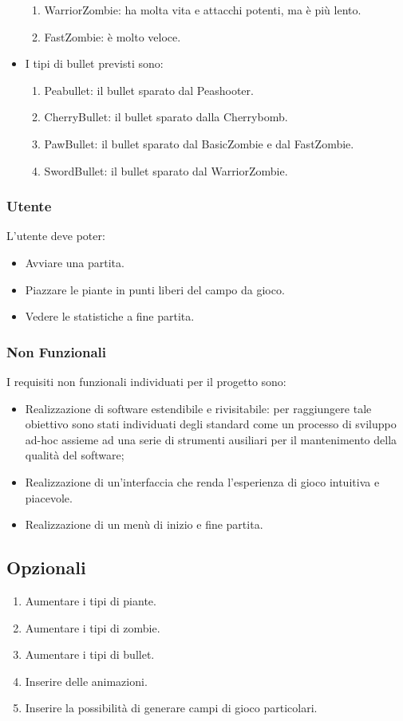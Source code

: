 \begin{itemize}
\begin{enumerate}
        \item WarriorZombie: ha molta vita e attacchi potenti, ma è più lento.
        \item FastZombie: è molto veloce.
    \end{enumerate}
    \item I tipi di bullet previsti sono:
    \begin{enumerate}
        \item Peabullet: il bullet sparato dal Peashooter.
        \item CherryBullet: il bullet sparato dalla Cherrybomb.
        \item PawBullet: il bullet sparato dal BasicZombie e dal FastZombie.
        \item SwordBullet: il bullet sparato dal WarriorZombie.
    \end{enumerate}
\end{itemize}

\subsubsection{Utente}
L'utente deve poter:
\begin{itemize}
    \item Avviare una partita.
    \item Piazzare le piante in punti liberi del campo da gioco.
    \item Vedere le statistiche a fine partita.
\end{itemize}

\subsubsection{Non Funzionali}
I requisiti non funzionali individuati per il progetto sono:
\begin{itemize}
    \item Realizzazione di software estendibile e rivisitabile: per raggiungere tale obiettivo sono stati individuati
    degli standard come un processo di sviluppo ad-hoc assieme ad una serie di strumenti ausiliari per il mantenimento
    della qualità del software;
    \item Realizzazione di un'interfaccia che renda l'esperienza di gioco intuitiva e piacevole.
    \item Realizzazione di un menù di inizio e fine partita.
\end{itemize}

\subsection{Opzionali}
\begin{enumerate}
    \item Aumentare i tipi di piante.
    \item Aumentare i tipi di zombie.
    \item Aumentare i tipi di bullet.
    \item Inserire delle animazioni.
    \item Inserire la possibilità di generare campi di gioco particolari.
\end{enumerate}

